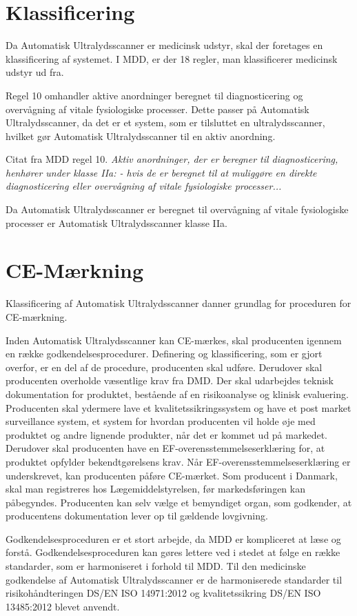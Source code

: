 \section{Klassificering}
Da Automatisk Ultralydsscanner er medicinsk udstyr, skal der foretages en klassificering af systemet. I MDD, er der 18 regler, man klassificerer medicinsk udstyr ud fra. 

Regel 10 omhandler aktive anordninger beregnet til diagnosticering og overvågning af vitale fysiologiske processer. Dette passer på Automatisk Ultralydsscanner, da det er et system, som er tilsluttet en ultralydsscanner, hvilket gør Automatisk Ultralydsscanner til en aktiv anordning.  

Citat fra MDD regel 10. 
\emph{Aktiv anordninger, der er beregner til diagnosticering, henhører under klasse IIa: - hvis de er beregnet til at muliggøre en direkte diagnosticering eller overvågning af vitale fysiologiske processer...}

Da Automatisk Ultralydsscanner er beregnet til overvågning af vitale fysiologiske processer er Automatisk Ultralydsscanner klasse IIa. 

\section{CE-Mærkning}
Klassificering af Automatisk Ultralydsscanner danner grundlag for proceduren for CE-mærkning. 

Inden Automatisk Ultralydsscanner kan CE-mærkes, skal producenten igennem en række godkendelsesprocedurer. Definering og klassificering, som er gjort overfor, er en del af de procedure, producenten skal udføre. Derudover skal producenten overholde væsentlige krav fra DMD. Der skal udarbejdes teknisk dokumentation for produktet, bestående af en risikoanalyse og klinisk evaluering. Producenten skal ydermere lave et kvalitetssikringssystem og have et post market surveillance system, et system for hvordan producenten vil holde øje med produktet og andre lignende produkter, når det er kommet ud på markedet. Derudover skal producenten have en EF-overensstemmelseserklæring for, at produktet opfylder bekendtgørelsens krav. Når EF-overensstemmelseserklæring er underskrevet, kan producenten påføre CE-mærket. Som producent i Danmark, skal man registreres hos Lægemiddelstyrelsen, før markedsføringen kan påbegyndes. Producenten kan selv vælge et bemyndiget organ, som godkender, at producentens dokumentation lever op til gældende lovgivning. \cite{Klasse} 

Godkendelsesproceduren er et stort arbejde, da MDD er kompliceret at læse og forstå. Godkendelsesproceduren kan gøres lettere ved i stedet at følge en række standarder, som er harmoniseret i forhold til MDD. Til den medicinske godkendelse af Automatisk Ultralydsscanner er de harmoniserede standarder til risikohåndteringen DS/EN ISO 14971:2012 \cite{14971} og kvalitetssikring DS/EN ISO 13485:2012 \cite{13485} blevet anvendt. 

